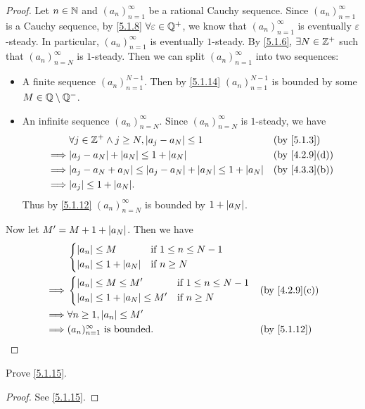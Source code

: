 \begin{proof}
  Let \(n \in \mathbb{N}\) and \((a_n)_{n = 1}^{\infty}\) be a rational Cauchy sequence.
  Since \((a_n)_{n = 1}^{\infty}\) is a Cauchy sequence, by \cref{5.1.8} \(\forall \varepsilon \in \mathbb{Q}^+\), we know that \((a_n)_{n = 1}^{\infty}\) is eventually \(\varepsilon\)-steady.
  In particular, \((a_n)_{n = 1}^{\infty}\) is eventually \(1\)-steady.
  By \cref{5.1.6}, \(\exists N \in \mathbb{Z}^+\) such that \((a_n)_{n = N}^{\infty}\) is \(1\)-steady.
  Then we can split \((a_n)_{n = 1}^{\infty}\) into two sequences:
  \begin{itemize}
    \item A finite sequence \((a_n)_{n = 1}^{N - 1}\).
          Then by \cref{5.1.14} \((a_n)_{n = 1}^{N - 1}\) is bounded by some \(M \in \mathbb{Q} \setminus \mathbb{Q}^-\).
    \item An infinite sequence \((a_n)_{n = N}^{\infty}\).
          Since \((a_n)_{n = N}^\infty\) is \(1\)-steady, we have
          \begin{align*}
                     & \forall j \in \Z^+ \land j \geq N, \abs{a_j - a_N} \leq 1                 &  & \by{5.1.3}    \\
            \implies & \abs{a_j - a_N} + \abs{a_N} \leq 1 + \abs{a_N}                            &  & \by{4.2.9}[d] \\
            \implies & \abs{a_j - a_N + a_N} \leq \abs{a_j - a_N} + \abs{a_N} \leq 1 + \abs{a_N} &  & \by{4.3.3}[b] \\
            \implies & \abs{a_j} \leq 1 + \abs{a_N}.
          \end{align*}
          Thus by \cref{5.1.12} \((a_n)_{n = N}^\infty\) is bounded by \(1 + \left\lvert a_N\right\rvert\).
  \end{itemize}
  Now let \(M' = M + 1 + \left\lvert a_N\right\rvert\).
  Then we have
  \begin{align*}
             & \begin{dcases}
                 \abs{a_n} \leq M             & \text{if } 1 \leq n \leq N - 1 \\
                 \abs{a_n} \leq 1 + \abs{a_N} & \text{if } n \geq N
               \end{dcases}                             \\
    \implies & \begin{dcases}
                 \abs{a_n} \leq M \leq M'             & \text{if } 1 \leq n \leq N - 1 \\
                 \abs{a_n} \leq 1 + \abs{a_N} \leq M' & \text{if } n \geq N
               \end{dcases} &  & \by{4.2.9}[c]                     \\
    \implies & \forall n \geq 1, \abs{a_n} \leq M'                                                       \\
    \implies & (a_n)_{n = 1}^\infty \text{ is bounded}.                                 &  & \by{5.1.12}
  \end{align*}
\end{proof}

\exercisesection

\begin{ex}\label{ex:5.1.1}
  Prove \cref{5.1.15}.
\end{ex}

\begin{proof}
  See \cref{5.1.15}.
\end{proof}
